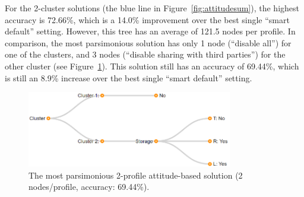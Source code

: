 %

For the 2-cluster solutions (the blue line in Figure~\ref{fig:attitudesum}), the highest accuracy is 72.66\%, which is a 14.0\% improvement over the best single ``smart default'' setting. However, this tree has an average of 121.5 nodes per profile. In comparison, the most parsimonious solution has only 1 node (``disable all'') for one of the clusters, and 3 nodes (``disable sharing with third parties'') for the other cluster (see Figure~\ref{fig:att_2_profile}). This solution still has an accuracy of 69.44\%, which is still an 8.9\% increase over the best single ``smart default'' setting.

\begin{figure}
	\centering
	\includegraphics[width=0.8\textwidth]{figures/fit_2_profile001.png}
	\caption{The most parsimonious 2-profile attitude-based solution (2 nodes/profile, accuracy: 69.44\%). %
	}
	\label{fig:att_2_profile}
\end{figure}

